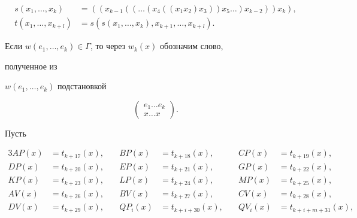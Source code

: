 \begin{align*} 


s(x_1,\dotsc,x_k)&=((x_{k-1}((\dotsc(x_4((x_1x_2)x_3))x_5\dotsc) 


x_{k-2}))x_k), \\ 


t(x_1,\dotsc,x_{k+l})&=s(s(x_1,\dotsc,x_k),x_{k+1},\dotsc,x_{k+l}). 


\end{align*} 


Если $w(e_1,\dotsc,e_k)\in\Gamma$, то через $w_k(x)$ обозначим слово, 


полученное из 


$w(e_1,\dotsc,e_k)$ подстановкой 


$$ 


\begin{pmatrix} 


e_1\dotsc e_k \\ x\dotsc x 


\end{pmatrix} 


.


$$ 


Пусть 


\begin{alignat*}{3} 


AP(x)&=t_{k+17}(x), &\quad BP(x)&=t_{k+18}(x), &\quad 


CP(x)&=t_{k+19}(x), \\ 


% 


DP(x)&=t_{k+20}(x), &\quad EP(x)&=t_{k+21}(x), &\quad 


GP(x)&=t_{k+22}(x), \\ 


% 


KP(x)&=t_{k+23}(x), &\quad LP(x)&=t_{k+24}(x), &\quad 


MP(x)&=t_{k+25}(x), \\ 


% 


AV(x)&=t_{k+26}(x), &\quad BV(x)&=t_{k+27}(x), &\quad 


CV(x)&=t_{k+28}(x), \\ 


% 


DV(x)&=t_{k+29}(x), &\quad QP_i(x)&=t_{k+i+30}(x), &\quad 


QV_i(x)&=t_{k+i+m+31}(x), 


\end{alignat*} 


